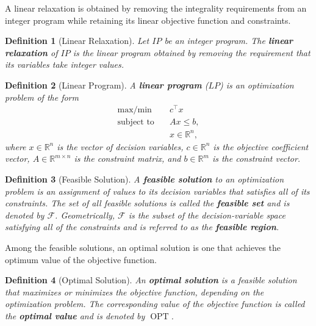 \documentclass[11pt]{report}
\newtheorem{definition}{Definition}[section]
\begin{document}
A linear relaxation is obtained by removing the integrality requirements from an integer program while retaining its linear objective function and constraints.

\begin{definition}[Linear Relaxation] \label{def::linear_relaxation}
  Let $IP$ be an integer program. The \textbf{linear relaxation} of $IP$ is the linear program obtained by removing the requirement that its variables take integer values.
\end{definition}

\begin{definition}[Linear Program] \label{def::linear_program}
  A \textbf{linear program} ($LP$) is an optimization problem of the form
  \[
  \begin{aligned}
  \text{max/min}\quad & c^\top x\\
  \text{subject to}\quad & Ax\leq b,\\
  & x\in\mathbb{R}^n,
  \end{aligned}
  \]
  where $x\in\mathbb{R}^n$ is the vector of decision variables, $c\in\mathbb{R}^n$ is the objective coefficient vector, $A\in\mathbb{R}^{m\times n}$ is the constraint matrix, and $b\in\mathbb{R}^m$ is the constraint vector.
\end{definition}

\begin{definition}[Feasible Solution] \label{def::feasible_solution}
  A \textbf{feasible solution} to an optimization problem is an assignment of values to its decision variables that satisfies all of its constraints. The set of all feasible solutions is called the \textbf{feasible set} and is denoted by $\mathcal{F}$. Geometrically, $\mathcal{F}$ is the subset of the decision-variable space satisfying all of the constraints and is referred to as the \textbf{feasible region}.
\end{definition}

Among the feasible solutions, an optimal solution is one that achieves the optimum value of the objective function.

\begin{definition}[Optimal Solution] \label{def::optimal_solution}
  An \textbf{optimal solution} is a feasible solution that maximizes or minimizes the objective function, depending on the optimization problem. The corresponding value of the objective function is called the \textbf{optimal value} and is denoted by $\operatorname{OPT}$.
\end{definition}
\end{document}
